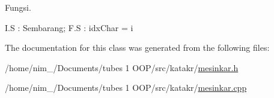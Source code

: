 Fungsi. 

I.\-S \-: Sembarang; F.\-S \-: idx\-Char = i 

The documentation for this class was generated from the following files\-:\begin{DoxyCompactItemize}
\item 
/home/nim\-\_/\-Documents/tubes 1 O\-O\-P/src/katakr/\hyperlink{katakr_2mesinkar_8h}{mesinkar.\-h}\item 
/home/nim\-\_/\-Documents/tubes 1 O\-O\-P/src/katakr/\hyperlink{mesinkar_8cpp}{mesinkar.\-cpp}\end{DoxyCompactItemize}
